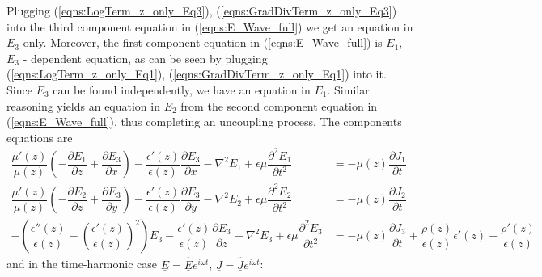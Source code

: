 \documentclass[12pt,twoside]{article}
\begin{document}
Plugging (\ref{eqns:LogTerm_z_only_Eq3}), (\ref{eqns:GradDivTerm_z_only_Eq3}) into the third component equation in (\ref{eqns:E_Wave_full}) we get an equation in $E_3$ only. Moreover, the first component equation in (\ref{eqns:E_Wave_full}) is $E_1$, $E_3$ - dependent equation, as can be seen by plugging (\ref{eqns:LogTerm_z_only_Eq1}), (\ref{eqns:GradDivTerm_z_only_Eq1}) into it. Since $E_3$ can be found independently, we have an equation in $E_1$. Similar reasoning yields an equation in $E_2$ from the second component equation in (\ref{eqns:E_Wave_full}), thus completing an uncoupling process. The components equations are
\begin{subequations}
\begin{align}
\dfrac{\mu'(z)}{\mu(z)}\left( -\dfrac{\partial E_1}{\partial z} + \dfrac{\partial E_3}{\partial x}\right)-\dfrac{\epsilon'(z)}{\epsilon(z)}\dfrac{\partial E_3}{\partial x}-\nabla^2 E_1 +\epsilon \mu\dfrac{\partial^2 E_1}{\partial t^2} &= -\mu(z)\dfrac{\partial J_1}{\partial t}	\label{eqns:Generalized_wave_z_coeffs_Eq1}\\
\dfrac{\mu'(z)}{\mu(z)}\left( -\dfrac{\partial E_2}{\partial z} + \dfrac{\partial E_3}{\partial y}\right)-\dfrac{\epsilon'(z)}{\epsilon(z)}\dfrac{\partial E_3}{\partial y}-\nabla^2 E_2 + \epsilon \mu\dfrac{\partial^2 E_2}{\partial t^2} &= -\mu(z)\dfrac{\partial J_2}{\partial t}	\label{eqns:Generalized_wave_z_coeffs_Eq2}\\
-\left( \dfrac{\epsilon''(z)}{\epsilon(z)}-\left( \dfrac{\epsilon'(z)}{\epsilon(z)}\right)^2 \right)E_3 -\dfrac{\epsilon'(z)}{\epsilon(z)}\dfrac{\partial E_3}{\partial z} - \nabla^2 E_3 +\epsilon \mu\dfrac{\partial^2 E_3}{\partial t^2} &= -\mu(z)\dfrac{\partial J_3}{\partial t} + \dfrac{\rho(z)}{\epsilon(z)}\epsilon'(z) - \dfrac{\rho'(z)}{\epsilon(z)} \label{eqns:Generalized_wave_z_coeffs_Eq3}
\end{align}
\end{subequations}
and in the time-harmonic case $\underline{E} = \underline{\hat{E}}e^{i \omega t}$, $\underline{J} = \underline{\hat{J}}e^{i \omega t}$:
\end{document}
